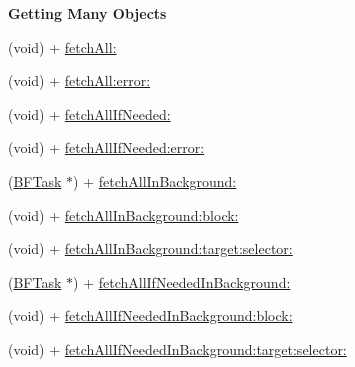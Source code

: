 \begin{Indent}{\bf Getting Many Objects}\par
{\em 

 

 }\begin{DoxyCompactItemize}
\item 
(void) + \hyperlink{interface_p_f_object_a055793138eed650aa66435cab1fef2f7}{fetch\+All\+:}
\item 
(void) + \hyperlink{interface_p_f_object_a9616196b45e87760d4d72b494e335fc7}{fetch\+All\+:error\+:}
\item 
(void) + \hyperlink{interface_p_f_object_abf6daa1d6ec178fa29dd59b086a60486}{fetch\+All\+If\+Needed\+:}
\item 
(void) + \hyperlink{interface_p_f_object_acf03ee604920fa8ed416b6617edde18d}{fetch\+All\+If\+Needed\+:error\+:}
\item 
(\hyperlink{interface_b_f_task}{B\+F\+Task} $\ast$) + \hyperlink{interface_p_f_object_a2491466b04768c3b45c3ef28fe3263d9}{fetch\+All\+In\+Background\+:}
\item 
(void) + \hyperlink{interface_p_f_object_a4eb3c5eb577ba7b8dfef8774d9c98c4e}{fetch\+All\+In\+Background\+:block\+:}
\item 
(void) + \hyperlink{interface_p_f_object_a110f30d5e8852de33ec73d2a00f04f01}{fetch\+All\+In\+Background\+:target\+:selector\+:}
\item 
(\hyperlink{interface_b_f_task}{B\+F\+Task} $\ast$) + \hyperlink{interface_p_f_object_ac0d11b45415b6100df9c83128eb89d1c}{fetch\+All\+If\+Needed\+In\+Background\+:}
\item 
(void) + \hyperlink{interface_p_f_object_af3bef9e42192f53d5b91c02c75b2d125}{fetch\+All\+If\+Needed\+In\+Background\+:block\+:}
\item 
(void) + \hyperlink{interface_p_f_object_ac04eae13cbd03d825e0b69ed29faed12}{fetch\+All\+If\+Needed\+In\+Background\+:target\+:selector\+:}
\end{DoxyCompactItemize}
\end{Indent}
